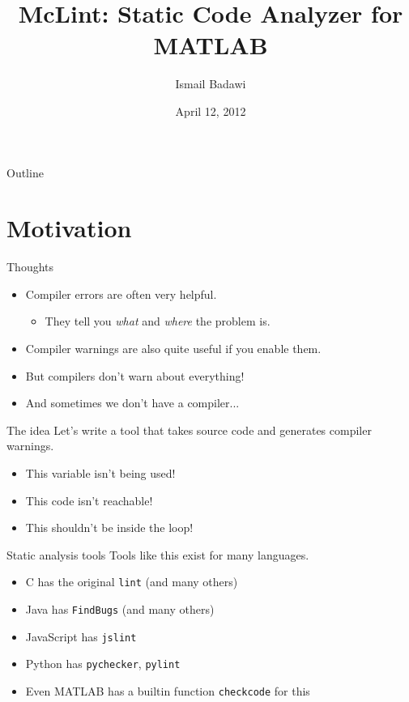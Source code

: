 \documentclass{beamer}
\title{McLint: Static Code Analyzer for MATLAB}
\author{Ismail Badawi}
\date{April 12, 2012}
\begin{document}
 
 
\begin{frame}
\maketitle
\end{frame}

\begin{frame}{Outline}
\tableofcontents
\end{frame}

\section{Motivation}
\begin{frame}{Thoughts}
\begin{itemize}
    \item Compiler errors are often very helpful.
        \begin{itemize}
        \item They tell you \emph{what} and \emph{where} the problem is.
        \end{itemize}
    \item Compiler warnings are also quite useful if you enable them.
    \item But compilers don't warn about everything!
    \item And sometimes we don't have a compiler...
\end{itemize}
\end{frame}

\begin{frame}{The idea}
Let's write a tool that takes source code and generates compiler warnings.
\begin{itemize}
    \item This variable isn't being used!
    \item This code isn't reachable!
    \item This shouldn't be inside the loop!
\end{itemize}
\end{frame}

\begin{frame}{Static analysis tools}
Tools like this exist for many languages.
\begin{itemize}
\item C has the original {\tt lint} (and many others)
\item Java has {\tt FindBugs} (and many others)
\item JavaScript has {\tt jslint}
\item Python has {\tt pychecker}, {\tt pylint}
\item Even MATLAB has a builtin function {\tt checkcode} for this
\end{itemize}
\end{frame}
\end{document}
